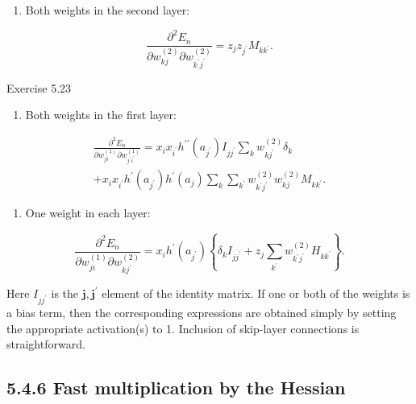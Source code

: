 \documentclass[
  10
]{article}
\providecommand{\tightlist}{%
  \setlength{\itemsep}{0pt}\setlength{\parskip}{0pt}}
\begin{document}
\begin{enumerate}
\def\labelenumi{\arabic{enumi}.}
\tightlist
\item
  Both weights in the second layer:
\end{enumerate}

\[
\frac {\partial^ {2} E _ {n}}{\partial w _ {k j} ^ {(2)} \partial w _ {k ^ {\prime} j ^ {\prime}} ^ {(2)}} = z _ {j} z _ {j ^ {\prime}} M _ {k k ^ {\prime}}.\tag{5.93}
\]

Exercise 5.23

\begin{enumerate}
\def\labelenumi{\arabic{enumi}.}
\setcounter{enumi}{1}
\tightlist
\item
  Both weights in the first layer:
\end{enumerate}

\[
\begin{array}{c} \frac {\partial^ {2} E _ {n}}{\partial w _ {j i} ^ {(1)} \partial w _ {j ^ {\prime} i ^ {\prime}} ^ {(1)}} = x _ {i} x _ {i ^ {\prime}} h ^ {\prime \prime} (a _ {j ^ {\prime}}) I _ {j j ^ {\prime}} \sum_ {k} w _ {k j ^ {\prime}} ^ {(2)} \delta_ {k} \\ + x _ {i} x _ {i ^ {\prime}} h ^ {\prime} (a _ {j ^ {\prime}}) h ^ {\prime} (a _ {j}) \sum_ {k} \sum_ {k ^ {\prime}} w _ {k ^ {\prime} j ^ {\prime}} ^ {(2)} w _ {k j} ^ {(2)} M _ {k k ^ {\prime}}. \end{array}\tag{5.94}
\]

\begin{enumerate}
\def\labelenumi{\arabic{enumi}.}
\setcounter{enumi}{2}
\tightlist
\item
  One weight in each layer:
\end{enumerate}

\[
\frac {\partial^ {2} E _ {n}}{\partial w _ {j i} ^ {(1)} \partial w _ {k j ^ {\prime}} ^ {(2)}} = x _ {i} h ^ {\prime} (a _ {j ^ {\prime}}) \left\{\delta_ {k} I _ {j j ^ {\prime}} + z _ {j} \sum_ {k ^ {\prime}} w _ {k ^ {\prime} j ^ {\prime}} ^ {(2)} H _ {k k ^ {\prime}} \right\}.\tag{5.95}
\]

Here \(I _ { j j ^ { \prime } }\) is the
\({ \boldsymbol { j } } , { \boldsymbol { j } } ^ { \prime }\) element
of the identity matrix. If one or both of the weights is a bias term,
then the corresponding expressions are obtained simply by setting the
appropriate activation(s) to 1. Inclusion of skip-layer connections is
straightforward.

\subsection{5.4.6 Fast multiplication by the
Hessian}\label{fast-multiplication-by-the-hessian}
\end{document}
